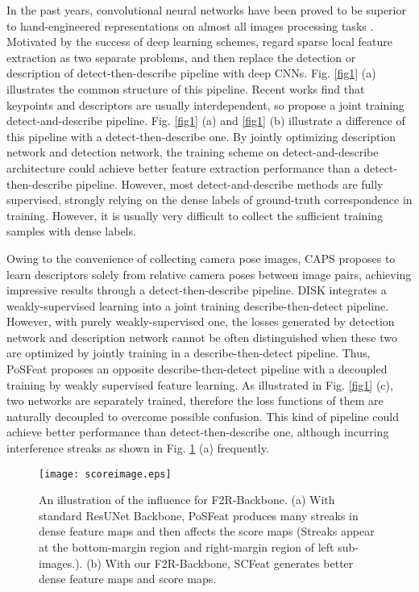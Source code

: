 \documentclass[journal]{IEEEtran}
\begin{document}
In the past years, convolutional neural networks have been proved to be superior to hand-engineered representations on almost all images processing tasks \cite{SuperPoint}. Motivated by the success of deep learning schemes, \cite{cndesc,LIFT,LF-Net,SOSNet,ContextDesc,caps} regard sparse local feature extraction as two separate problems, and then replace the detection or description of detect-then-describe pipeline with deep CNNs. Fig. \ref{fig1} (a) illustrates the common structure of this pipeline. Recent works \cite{D2net,R2D2,aslfeat} find that keypoints and descriptors are usually interdependent, so propose a joint training detect-and-describe pipeline. Fig. \ref{fig1} (a) and \ref{fig1} (b) illustrate a difference of this pipeline with a detect-then-describe one. By jointly optimizing description network and detection network, the training scheme on detect-and-describe architecture could achieve better feature extraction performance than a detect-then-describe pipeline. However, most detect-and-describe methods are fully supervised, strongly relying on the dense labels of ground-truth correspondence in training. However, it is usually very difficult to collect the sufficient training samples with dense labels.

Owing to the convenience of collecting camera pose images, CAPS \cite{caps} proposes to learn descriptors solely from relative camera poses between image pairs, achieving impressive results through a detect-then-describe pipeline. DISK \cite{disk} integrates a weakly-supervised learning into a joint training describe-then-detect pipeline. However, with purely weakly-supervised one, the losses generated by detection network and description network cannot be often distinguished when these two are optimized by jointly training in a describe-then-detect pipeline. Thus, PoSFeat \cite{li2022decoupling} proposes an opposite describe-then-detect pipeline with a decoupled training by weakly supervised feature learning. As illustrated in Fig. \ref{fig1} (c), two networks are separately trained, therefore the loss functions of them are naturally decoupled to overcome possible confusion. This kind of pipeline could achieve better performance than detect-then-describe one, although incurring interference streaks as shown in Fig. \ref{fig2} (a) frequently.

\begin{figure}[t]
\centering
\texttt{[image: scoreimage.eps]} \caption{An illustration of the influence for F2R-Backbone. (a) With standard ResUNet Backbone, PoSFeat produces many streaks in dense feature maps and then affects the score maps (Streaks appear at the bottom-margin region and right-margin region of left sub-images.). (b) With our F2R-Backbone, SCFeat generates better dense feature maps and score maps.}
\label{fig2}
\end{figure}
\end{document}
